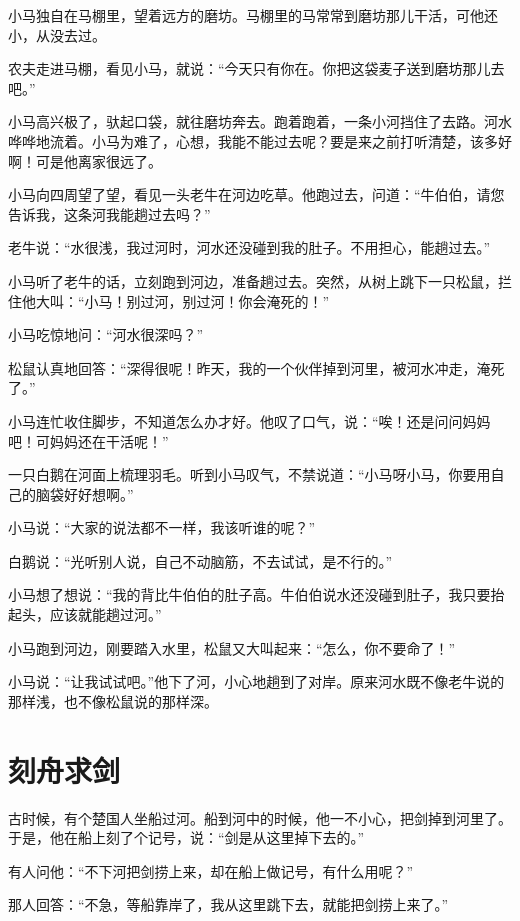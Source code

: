 \documentclass[12pt,UTF-8,openany]{ctexbook}
\begin{document}
\begin{Large}
    
    小马独自在马棚里，望着远方的磨坊。马棚里的马常常到磨坊那儿干活，可他还小，从没去过。
    
    农夫走进马棚，看见小马，就说：“今天只有你在。你把这袋麦子送到磨坊那儿去吧。”
    
    小马高兴极了，驮起口袋，就往磨坊奔去。跑着跑着，一条小河挡住了去路。河水哗哗地流着。小马为难了，心想，我能不能过去呢？要是来之前打听清楚，该多好啊！可是他离家很远了。
    
    小马向四周望了望，看见一头老牛在河边吃草。他跑过去，问道：“牛伯伯，请您告诉我，这条河我能趟过去吗？”
    
    老牛说：“水很浅，我过河时，河水还没碰到我的肚子。不用担心，能趟过去。”
    
    小马听了老牛的话，立刻跑到河边，准备趟过去。突然，从树上跳下一只松鼠，拦住他大叫：“小马！别过河，别过河！你会淹死的！”
    
    小马吃惊地问：“河水很深吗？”
    
    松鼠认真地回答：“深得很呢！昨天，我的一个伙伴掉到河里，被河水冲走，淹死了。”
    
    小马连忙收住脚步，不知道怎么办才好。他叹了口气，说：“唉！还是问问妈妈吧！可妈妈还在干活呢！”
    
    一只白鹅在河面上梳理羽毛。听到小马叹气，不禁说道：“小马呀小马，你要用自己的脑袋好好想啊。”
    
    小马说：“大家的说法都不一样，我该听谁的呢？”
    
    白鹅说：“光听别人说，自己不动脑筋，不去试试，是不行的。”
    
    小马想了想说：“我的背比牛伯伯的肚子高。牛伯伯说水还没碰到肚子，我只要抬起头，应该就能趟过河。”
    
    小马跑到河边，刚要踏入水里，松鼠又大叫起来：“怎么，你不要命了！”
    
    小马说：“让我试试吧。”他下了河，小心地趟到了对岸。原来河水既不像老牛说的那样浅，也不像松鼠说的那样深。
    
\end{Large}

\chapter{刻舟求剑}

\begin{Large}
    
    古时候，有个楚国人坐船过河。船到河中的时候，他一不小心，把剑掉到河里了。于是，他在船上刻了个记号，说：“剑是从这里掉下去的。”
    
    有人问他：“不下河把剑捞上来，却在船上做记号，有什么用呢？”
    
    那人回答：“不急，等船靠岸了，我从这里跳下去，就能把剑捞上来了。”
    
\end{Large}
\end{document}
